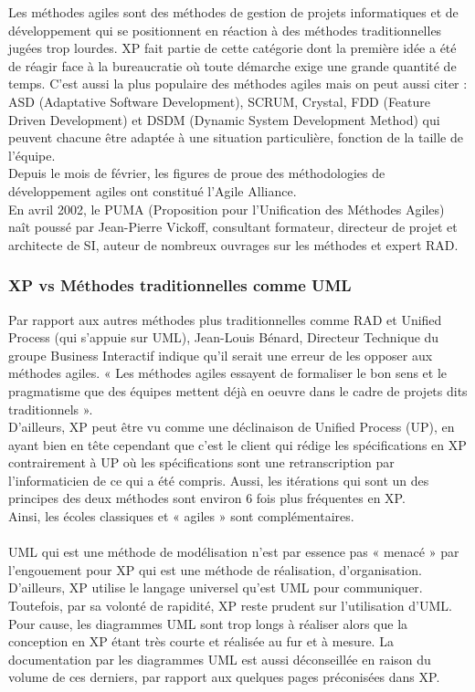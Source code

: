 \documentclass[]{article}
\begin{document}
Les méthodes agiles sont des méthodes de gestion de projets
informatiques et de développement qui se positionnent en réaction à des
méthodes traditionnelles jugées trop lourdes. XP fait partie de cette
catégorie dont la première idée a été de réagir face à la bureaucratie
où toute démarche exige une grande quantité de temps. C'est aussi la
plus populaire des méthodes agiles mais on peut aussi citer : ASD
(Adaptative Software Development), SCRUM, Crystal, FDD (Feature Driven
Development) et DSDM (Dynamic System Development Method) qui peuvent
chacune être adaptée à une situation particulière, fonction de la taille
de l'équipe.\\
Depuis le mois de février, les figures de proue des méthodologies de
développement agiles ont constitué l'Agile Alliance.\\
En avril 2002, le PUMA (Proposition pour l'Unification des Méthodes
Agiles) naît poussé par Jean-Pierre Vickoff, consultant formateur,
directeur de projet et architecte de SI, auteur de nombreux ouvrages sur
les méthodes et expert RAD.



\hypertarget{xp-vs-muxe9thodes-traditionnelles-comme-uml}{%
\subsubsection{XP vs Méthodes traditionnelles comme
UML}\label{xp-vs-muxe9thodes-traditionnelles-comme-uml}}

Par rapport aux autres méthodes plus traditionnelles comme RAD et
Unified Process (qui s'appuie sur UML), Jean-Louis Bénard, Directeur
Technique du groupe Business Interactif indique qu'il serait une erreur
de les opposer aux méthodes agiles. « Les méthodes agiles essayent de
formaliser le bon sens et le pragmatisme que des équipes mettent déjà en
oeuvre dans le cadre de projets dits traditionnels ».\\
D'ailleurs, XP peut être vu comme une déclinaison de Unified Process
(UP), en ayant bien en tête cependant que c'est le client qui rédige les
spécifications en XP contrairement à UP où les spécifications sont une
retranscription par l'informaticien de ce qui a été compris. Aussi, les
itérations qui sont un des principes des deux méthodes sont environ 6
fois plus fréquentes en XP.\\
Ainsi, les écoles classiques et « agiles » sont complémentaires.~\\
~\\
UML qui est une méthode de modélisation n'est par essence pas « menacé »
par l'engouement pour XP qui est une méthode de réalisation,
d'organisation.~\\
D'ailleurs, XP utilise le langage universel qu'est UML pour communiquer.
Toutefois, par sa volonté de rapidité, XP reste prudent sur
l'utilisation d'UML. Pour cause, les diagrammes UML sont trop longs à
réaliser alors que la conception en XP étant très courte et réalisée au
fur et à mesure. La documentation par les diagrammes UML est aussi
déconseillée en raison du volume de ces derniers, par rapport aux
quelques pages préconisées dans XP.~
\end{document}

